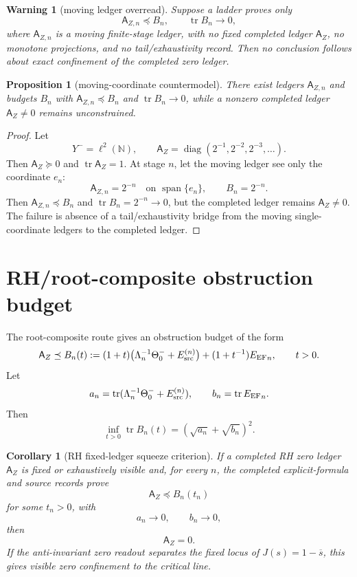 \documentclass[11pt]{article}
\newtheorem{proposition}[theorem]{Proposition}
\newtheorem{corollary}[theorem]{Corollary}
\newtheorem{warning}[theorem]{Warning}
\newcommand{\AZ}{\mathsf A_Z}
\newcommand{\EF}{E_{\rm EF}}
\newcommand{\Esrc}{E_{\rm src}}
\newcommand{\Thetao}{\Theta_0^-}
\newcommand{\tr}{\operatorname{tr}}
\begin{document}
\begin{warning}[moving ledger overread]
Suppose a ladder proves only
\[
    \mathsf A_{Z,n}\preceq B_n,
    \qquad \tr B_n\to0,
\]
where \(\mathsf A_{Z,n}\) is a moving finite-stage ledger, with no fixed completed ledger \(\AZ\), no monotone projections, and no tail/exhaustivity record.  Then no conclusion follows about exact confinement of the completed zero ledger.
\end{warning}

\begin{proposition}[moving-coordinate countermodel]
There exist ledgers \(\mathsf A_{Z,n}\) and budgets \(B_n\) with \(\mathsf A_{Z,n}\preceq B_n\) and \(\tr B_n\to0\), while a nonzero completed ledger \(\AZ\ne0\) remains unconstrained.
\end{proposition}

\begin{proof}
Let
\[
   Y^- = \ell^2(\mathbb N),
   \qquad
   \AZ=\operatorname{diag}(2^{-1},2^{-2},2^{-3},\ldots).
\]
Then \(\AZ\succeq0\) and \(\tr\AZ=1\).  At stage \(n\), let the moving ledger see only the coordinate \(e_n\):
\[
   \mathsf A_{Z,n}=2^{-n}\quad\text{on }\operatorname{span}\{e_n\},
   \qquad
   B_n=2^{-n}.
\]
Then \(\mathsf A_{Z,n}\preceq B_n\) and \(\tr B_n=2^{-n}\to0\), but the completed ledger remains \(\AZ\ne0\).  The failure is absence of a tail/exhaustivity bridge from the moving single-coordinate ledgers to the completed ledger.
\end{proof}

\section{RH/root-composite obstruction budget}

The root-composite route gives an obstruction budget of the form
\[
  \AZ\preceq
  B_n(t)
  :=(1+t)\bigl(\Lambda_n^{-1}\Thetao + \Esrc^{(n)}\bigr)
     +(1+t^{-1}){\EF}_n,
  \qquad t>0.
\]
Let
\[
   a_n=\tr(\Lambda_n^{-1}\Thetao+\Esrc^{(n)}),
   \qquad
   b_n=\tr {\EF}_n.
\]
Then
\[
   \inf_{t>0}\tr B_n(t)=(\sqrt{a_n}+\sqrt{b_n})^2.
\]

\begin{corollary}[RH fixed-ledger squeeze criterion]
If a completed RH zero ledger \(\AZ\) is fixed or exhaustively visible and, for every \(n\), the completed explicit-formula and source records prove
\[
   \AZ\preceq B_n(t_n)
\]
for some \(t_n>0\), with
\[
   a_n\to0,
   \qquad
   b_n\to0,
\]
then
\[
   \AZ=0.
\]
If the anti-invariant zero readout separates the fixed locus of \(J(s)=1-\overline{s}\), this gives visible zero confinement to the critical line.
\end{corollary}
\end{document}
